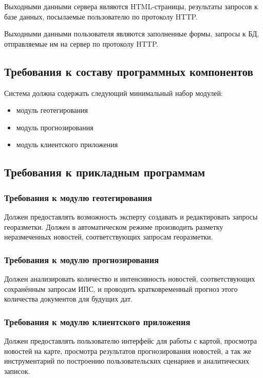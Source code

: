 \documentclass[russian,utf8,emptystyle]{eskdtext}
\begin{document}
Выходными данными сервера являются HTML-страницы, результаты запросов к базе данных, посылаемые пользователю по протоколу HTTP.

Выходными данными пользователя являются заполненные формы, запросы к БД, отправляемые им на сервер по протоколу HTTP.

\subsection{Требования к составу программных компонентов}

Система должна содержать следующий минимальный набор модулей:
\begin{itemize}
\item модуль геотегирования
\item модуль прогнозирования
\item модуль клиентского приложения
\end{itemize}

\subsection{Требования к прикладным программам}

\subsubsection{Требования к модулю геотегирования}

Должен предоставлять возможность эксперту создавать и редактировать запросы георазметки. 
Должен в автоматическом режиме производить разметку неразмеченных новостей, соответствующих запросам георазметки.

\subsubsection{Требования к модулю прогнозирования}

Должен анализировать количество и интенсивность новостей, соответствующих сохранённым запросам ИПС, и проводить кратковременный прогноз этого количества документов для будущих дат.

\subsubsection{Требования к модулю клиентского приложения}

Должен предоставлять пользователю интерфейс для работы с картой, просмотра новостей на карте, просмотра результатов прогнозирования новостей, а так же инструментарий по построению пользовательских сценариев и аналитических записок.
\end{document}

